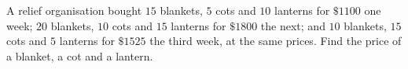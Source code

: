 A relief organisation bought $15$ blankets, $5$ cots and $10$ lanterns for $\$1100$ one week; $20$ blankets, $10$ cots and $15$ lanterns for $\$1800$ the next; and $10$ blankets, $15$ cots and $5$ lanterns for $\$1525$ the third week, at the same prices. Find the price of a blanket, a cot and a lantern.
